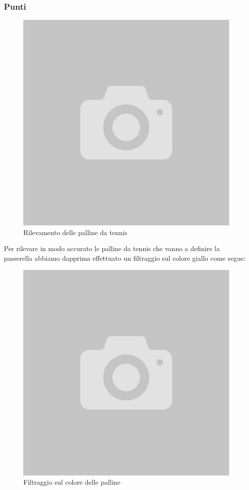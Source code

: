 \documentclass[twoside]{supsistudent}
\begin{document}
\subsubsection{Punti}
\begin{figure}[H]
  \center
  \includegraphics[scale=0.40]{images/empty.jpg}
  \caption{Rilevamento delle palline da tennis}
\end{figure}
Per rilevare in modo accurato le palline da tennis che vanno a definire la passerella abbiamo dapprima effettuato un 
filtraggio sul colore giallo come segue:
\begin{figure}[H]
  \center
  \includegraphics[scale=0.40]{images/empty.jpg}
  \caption{Filtraggio sul colore delle palline}
\end{figure}
\end{document}
